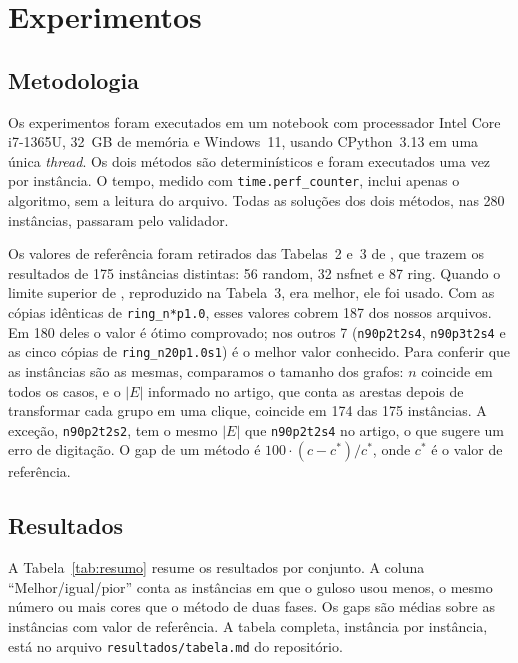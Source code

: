 \documentclass[12pt]{article}
\begin{document}
\section{Experimentos}\label{sec:experimentos}

\subsection{Metodologia}

Os experimentos foram executados em um notebook com processador Intel Core
i7-1365U, 32~GB de memória e Windows~11, usando CPython~3.13 em uma única
\emph{thread}. Os dois métodos são determinísticos e foram executados uma vez
por instância. O tempo, medido com \texttt{time.perf\_counter}, inclui apenas o
algoritmo, sem a leitura do arquivo. Todas as soluções dos dois métodos, nas
280 instâncias, passaram pelo validador.

Os valores de referência foram retirados das Tabelas~2 e~3 de
\cite{furini2018}, que trazem os resultados de 175 instâncias distintas: 56
random, 32 nsfnet e 87 ring. Quando o limite superior de \cite{hoshino2011},
reproduzido na Tabela~3, era melhor, ele foi usado. Com as cópias idênticas de
\texttt{ring\_n*p1.0}, esses valores cobrem 187 dos nossos arquivos. Em 180
deles o valor é ótimo comprovado; nos outros 7 (\texttt{n90p2t2s4},
\texttt{n90p3t2s4} e as cinco cópias de \texttt{ring\_n20p1.0s1}) é o melhor
valor conhecido. Para conferir que as instâncias são as mesmas, comparamos o
tamanho dos grafos: $n$ coincide em todos os casos, e o $|E|$ informado no
artigo, que conta as arestas depois de transformar cada grupo em uma clique,
coincide em 174 das 175 instâncias. A exceção, \texttt{n90p2t2s2}, tem o mesmo
$|E|$ que \texttt{n90p2t2s4} no artigo, o que sugere um erro de digitação. O
gap de um método é $100\cdot(c-c^*)/c^*$, onde $c^*$ é o valor de referência.

\subsection{Resultados}

A Tabela~\ref{tab:resumo} resume os resultados por conjunto. A coluna
``Melhor/igual/pior'' conta as instâncias em que o guloso usou menos, o mesmo
número ou mais cores que o método de duas fases. Os gaps são médias sobre as
instâncias com valor de referência. A tabela completa, instância por instância,
está no arquivo \texttt{resultados/tabela.md} do repositório.
\end{document}
